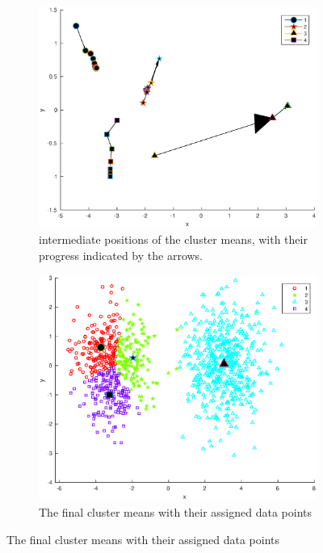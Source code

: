 \documentclass[10pt]{article}
\begin{document}
\begin{figure}[H]
  \centering
  \caption{Results for k=4}
  \begin{subfigure}[b]{.45\textwidth}
    \includegraphics[width=\columnwidth]{Fig1_k4.eps}
    \caption{intermediate positions of the cluster means, 
    with their progress indicated by the arrows.}
  \end{subfigure}
  \quad
  \begin{subfigure}[b]{.45\textwidth}
    \includegraphics[width=\columnwidth]{Fig2_k4.eps}
    \caption{The final cluster means with their assigned data points}
  \end{subfigure}
  \label{fig1.2}
\end{figure}
\end{document}

